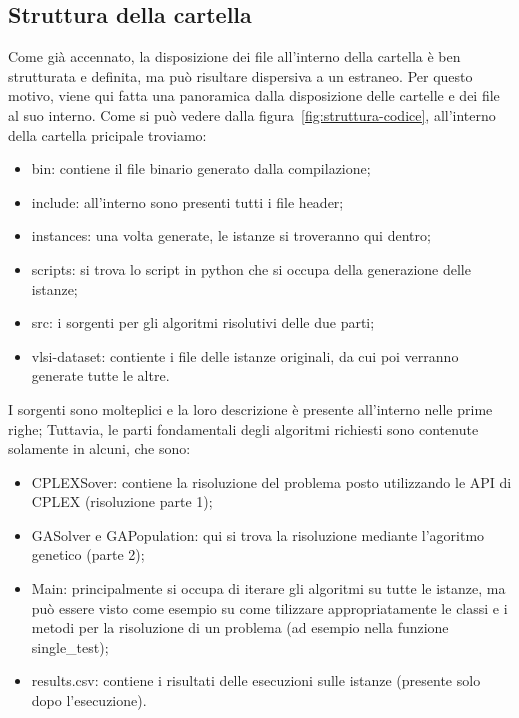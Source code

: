 \subsection{Struttura della cartella}\label{subsec:struttura}
Come già accennato, la disposizione dei file all'interno della cartella è ben strutturata e definita,
ma può risultare dispersiva a un estraneo.
Per questo motivo, viene qui fatta una panoramica dalla disposizione delle cartelle e dei file al suo interno.
Come si può vedere dalla figura~\ref{fig:struttura-codice}, all'interno della cartella pricipale troviamo:
\begin{itemize}
	\item \textsf{bin}: contiene il file binario generato dalla compilazione;
	\item \textsf{include}: all'interno sono presenti tutti i file header;
	\item \textsf{instances}: una volta generate, le istanze si troveranno qui dentro;
	\item \textsf{scripts}: si trova lo script in python che si occupa della generazione
	delle istanze;
	\item \textsf{src}: i sorgenti per gli algoritmi risolutivi delle due parti;
	\item \textsf{vlsi-dataset}: contiente i file delle istanze originali, da cui poi verranno generate tutte le altre.
\end{itemize}
%
I sorgenti sono molteplici e la loro descrizione è presente all'interno nelle prime righe;
Tuttavia, le parti fondamentali degli algoritmi richiesti sono contenute solamente in alcuni, che sono:
\begin{itemize}
	\item \textsf{CPLEXSover}: contiene la risoluzione del problema posto utilizzando le API di CPLEX (risoluzione parte 1);
	\item \textsf{GASolver} e \textsf{GAPopulation}: qui si trova la risoluzione mediante l'agoritmo genetico (parte 2);
	\item \textsf{Main}: principalmente si occupa di iterare gli algoritmi su tutte le istanze,
	ma può essere visto come esempio su come tilizzare appropriatamente le classi e i metodi per la
	risoluzione di un problema (ad esempio nella funzione \textsf{single\_test});
	\item \textsf{results.csv}: contiene i risultati delle esecuzioni sulle istanze (presente solo dopo l'esecuzione).
\end{itemize}
%
\label{fig:struttura-codice}
